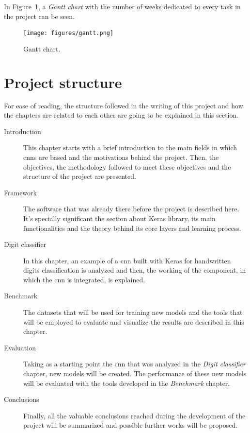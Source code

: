 In Figure~\ref{fig:gantt}, a \emph{Gantt chart} with the number of weeks dedicated to every task in the project can be seen.
\begin{figure}
	\centering
	\texttt{[image: figures/gantt.png]}
	\caption{Gantt chart.}
	\label{fig:gantt}
\end{figure}

\section{Project structure}
For ease of reading, the structure followed in the writing of this project and how the chapters are related to each other are going to be explained in this section.

\begin{description}
	\item[Introduction] This chapter starts with a brief introduction to the main fields in which \glspl{cnn} are based and the motivations behind the project. Then, the objectives, the methodology followed to meet these objectives and the structure of the project are presented.
	\item[Framework] The software that was already there before the project is described here. It's specially significant the section about Keras library, its main functionalities and the theory behind its core layers and learning process.
	\item[Digit classifier] In this chapter, an example of a \gls{cnn} built with Keras for handwritten digits classification is analyzed and then, the working of the component, in which the \gls{cnn} is integrated, is explained.
	\item[Benchmark] The datasets that will be used for training new models and the tools that will be employed to evaluate and visualize the results are described in this chapter.
	\item[Evaluation] Taking as a starting point the \gls{cnn} that was analyzed in the \textit{Digit classifier} chapter, new models will be created. The performance of these new models will be evaluated with the tools developed in the \textit{Benchmark} chapter.
	\item[Conclusions] Finally, all the valuable conclusions reached during the development of the project will be summarized and possible further works will be proposed.
\end{description}
